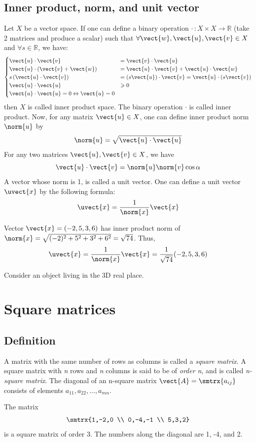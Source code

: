 \subsection{Inner product, norm, and unit vector}
Let $X$ be a vector space. If one can define a binary operation $\cdot \, : X \times X \rightarrow \mathbb{R}$ (take 2 matrices and produce a scalar) such that $\forall \vect{w},\vect{u},\vect{v}\in X$ and $\forall s\in \mathbb{R}$, we have:
\begin{equation*}
\begin{cases}
    \vect{u} \cdot \vect{v} &= \vect{v} \cdot \vect{u} \\
    \vect{u} \cdot \left( \vect{v}+\vect{w} \right) &= \vect{u} \cdot \vect{v} + \vect{u} \cdot \vect{w} \\
    s\left( \vect{u} \cdot \vect{v} \right) &= \left( s\vect{u} \right)\cdot \vect{v}=\vect{u} \cdot \left( s\vect{v} \right) \\
    \vect{u} \cdot \vect{u} & \geqslant 0 \\
    \vect{u} \cdot \vect{u} = 0 \Leftrightarrow \vect{u}=0
\end{cases}
\end{equation*}
then $X$ is called inner product space. The binary operation $\cdot$ is called inner product. Now, for any matrix $\vect{u}\in X$, one can define inner product norm $\norm{u}$ by \[ \norm{u}=\sqrt{\vect{u} \cdot \vect{u}} \]
For any two matrices $\vect{u},\vect{v}\in X$, we have \[ \vect{u} \cdot \vect{v} = \norm{u}\norm{v}\cos \alpha \]
A vector whose norm is 1, is called a unit vector. One can define a unit vector $\uvect{x}$ by the following formula: \[ \uvect{x}=\frac{1}{\norm{x}}\vect{x} \]
\begin{example}
Vector $\vect{x}=(-2,5,3,6)$ has inner product norm of $\norm{x}=\sqrt{(-2)^2+5^2+3^2+6^2}=\sqrt{74}$. Thus, \[ \uvect{x}=\frac{1}{\norm{x}}\vect{x}=\frac{1}{\sqrt{74}} (-2,5,3,6) \]
\end{example}
\begin{example}
Consider an object living in the 3D real place.
\end{example}
\section{Square matrices}
\subsection{Definition}
A matrix with the same number of rows as columns is called a \emph{square matrix}. A square matrix with \emph{n} rows and \emph{n} columns is said to be of \emph{order n}, and is called \emph{n-square matrix}. The diagonal of an n-square matrix $\vect{A}=\smtrx{a_{ij}}$ consists of elements $a_{11},a_{22},\ldots , a_{mn}$.
\begin{example}
The matrix \[ \smtrx{1,-2,0 \\ 0,-4,-1 \\ 5,3,2} \] is a square matrix of order 3. The numbers along the diagonal are 1, -4, and 2.
\end{example}
